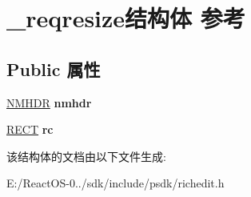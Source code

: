 \hypertarget{struct__reqresize}{}\section{\+\_\+reqresize结构体 参考}
\label{struct__reqresize}
\subsection*{Public 属性}
\begin{DoxyCompactItemize}
\item 
\mbox{\label{struct__reqresize_ac53cad805b20e82b393218844cb74b29}} 
\hyperlink{structtag_n_m_h_d_r}{N\+M\+H\+DR} {\bfseries nmhdr}
\item 
\mbox{\label{struct__reqresize_ad35b7aaebd27969bebed0ef37a76db78}} 
\hyperlink{structtag_r_e_c_t}{R\+E\+CT} {\bfseries rc}
\end{DoxyCompactItemize}


该结构体的文档由以下文件生成\+:\begin{DoxyCompactItemize}
\item 
E\+:/\+React\+O\+S-\/0../sdk/include/psdk/richedit.\+h\end{DoxyCompactItemize}
